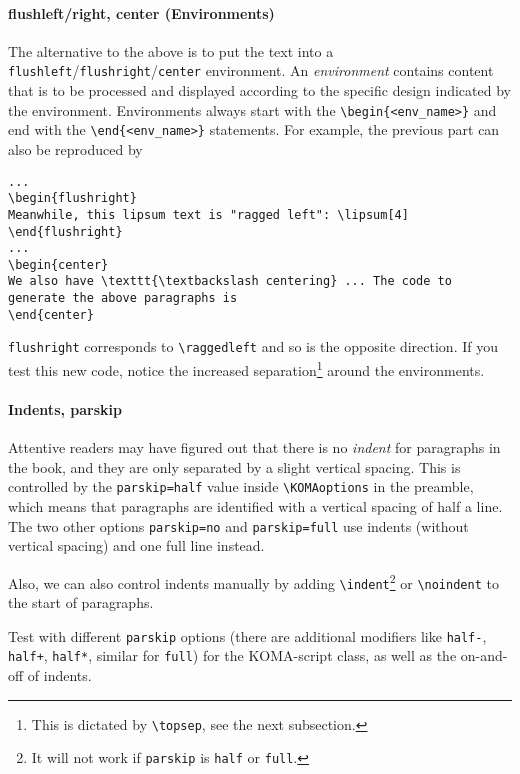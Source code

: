 \paragraph{flushleft/right, center (Environments)}
The alternative to the above is to put the text into a \verb|flushleft|/\verb|flushright|/\verb|center| environment. An \textit{environment} contains content that is to be processed and displayed according to the specific design indicated by the environment. Environments always start with the \texttt{\textbackslash begin\{<env\_name>\}} and end with the \texttt{\textbackslash end\{<env\_name>\}} statements. For example, the previous part can also be reproduced by
\begin{lstlisting}
...
\begin{flushright}
Meanwhile, this lipsum text is "ragged left": \lipsum[4]
\end{flushright}
...
\begin{center}
We also have \texttt{\textbackslash centering} ... The code to generate the above paragraphs is
\end{center}
\end{lstlisting}
\texttt{flushright} corresponds to \texttt{\textbackslash raggedleft} and so is the opposite direction. If you test this new code, notice the increased separation\footnote{This is dictated by \texttt{\textbackslash topsep}, see the next subsection.} around the environments. 

\paragraph{Indents, parskip}
Attentive readers may have figured out that there is no \textit{indent} for paragraphs in the book, and they are only separated by a slight vertical spacing. This is controlled by the \verb|parskip=half| value inside \texttt{\textbackslash KOMAoptions} in the preamble, which means that paragraphs are identified with a vertical spacing of half a line. The two other options \verb|parskip=no| and \verb|parskip=full| use indents (without vertical spacing) and one full line instead. 

Also, we can also control indents manually by adding \texttt{\textbackslash indent}\footnote{It will not work if \texttt{parskip} is \texttt{half} or \texttt{full}.} or \texttt{\textbackslash noindent} to the start of paragraphs.
\begin{exercisebox}
\begin{Exercise}
Test with different \verb|parskip| options (there are additional modifiers like \verb|half-|, \verb|half+|, \verb|half*|, similar for \verb|full|) for the KOMA-script class, as well as the on-and-off of indents.     
\end{Exercise}
\end{exercisebox}

